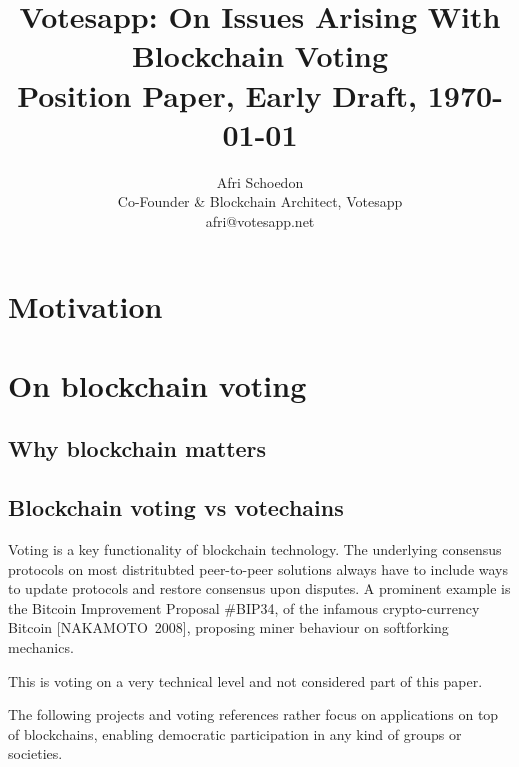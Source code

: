 \documentclass[9pt,oneside]{amsart}
\title{Votesapp: On Issues Arising With Blockchain Voting \\ {\smaller \textbf{Position Paper, Early Draft}, \today}}
\author{
    Afri Schoedon\\
    Co-Founder \& Blockchain Architect, Votesapp\\
    afri@votesapp.net
}
\begin{document}
\pagecolor{lightblue}

\begin{abstract}
\end{abstract}

\maketitle

\setlength{\columnsep}{20pt}
\begin{multicols}{2}

\section{Motivation}\label{sec:motivation}


\section{On blockchain voting}

\subsection{Why blockchain matters}

\subsection{Blockchain voting vs votechains}
Voting is a key functionality of blockchain technology. The underlying consensus protocols on most distritubted peer-to-peer solutions always have to include ways to update protocols and restore consensus upon disputes. A prominent example is the Bitcoin Improvement Proposal \#BIP34, of the infamous crypto-currency Bitcoin [NAKAMOTO~2008], proposing miner behaviour on softforking mechanics.\par
This is voting on a very technical level and not considered part of this paper.\par
The following projects and voting references rather focus on applications on top of blockchains, enabling democratic participation in any kind of groups or societies.


\end{multicols}
\end{document}
